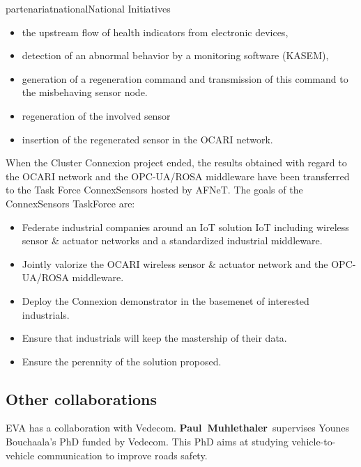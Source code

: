 \documentclass{ra2016}
\newcommand{\paul}             {\textbf{Paul~Muhlethaler}}
\begin{document}
\begin{module}{partenariat}{national}{National Initiatives}
\begin{itemize}
    \item the upstream flow of health indicators from electronic devices,
    \item detection of an abnormal behavior by a monitoring software (KASEM),  
    \item generation of a regeneration command and transmission of this command to the misbehaving sensor node.
    \item regeneration of the involved sensor
    \item insertion of the regenerated sensor in the OCARI network.\\
\end{itemize}

When the Cluster Connexion project ended, the results obtained with regard to the OCARI network and the OPC-UA/ROSA middleware have been transferred to the Task Force ConnexSensors hosted by AFNeT. The goals of the ConnexSensors TaskForce are:

\begin{itemize}
    \item Federate industrial companies around an IoT solution IoT including wireless sensor \& actuator networks and a standardized industrial middleware.
    \item Jointly valorize the OCARI wireless sensor \& actuator network and the OPC-UA/ROSA middleware.
    \item Deploy the Connexion demonstrator in the basemenet of interested industrials. 
    \item Ensure that industrials will keep the mastership of their data. 
    \item Ensure the perennity of the solution proposed.\\
\end{itemize}

\subsection{Other collaborations}

EVA has a collaboration with Vedecom. 
\paul~supervises Younes Bouchaala's PhD funded by Vedecom. This PhD aims at 
studying vehicle-to-vehicle communication to improve roads safety. 

\end{module} 

\end{document}
